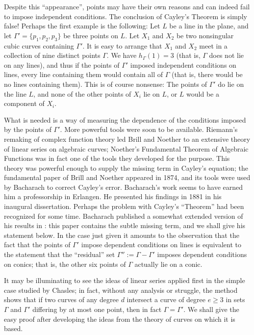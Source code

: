 \documentclass{bull-l}
\theoremstyle{pplain}
\theoremstyle{definition}
\begin{document}
Despite this ``appearance'', points may have their own reasons and can indeed
fail to impose independent conditions.  The conclusion of Cayley's Theorem is
simply false!  Perhaps the first example is the following: Let $L$ be a line in
the plane, and let $\Gamma'=\{p_1,p_2,p_3\}$ be three points on $L$.  Let $X_1$
and $X_2$ be two nonsingular cubic curves containing $\Gamma'$.  It is easy to
arrange that $X_1$ and $X_2$ meet in a collection of nine distinct points $
\Gamma$. We have $h_\Gamma(1)=3$ (that is, $\Gamma$ does not lie on any lines),
and thus if the points of $\Gamma'$ imposed independent conditions on lines,
every line containing them would contain all of $\Gamma$ (that is, there would
be no lines containing them).  This is of course nonsense: The points of $
\Gamma'$ do lie on the line $L$, and none of the other points of
$X_i$ lie on $L$, or $L$ would be a component of $X_i$.

What is needed is a way of measuring the dependence of the conditions imposed
by the points of $\Gamma'$. More powerful tools were soon to be available.  
Riemann's remaking of complex function theory led Brill and Noether to an
extensive theory of linear series on algebraic curves; Noether's Fundamental 
Theorem of Algebraic Functions was in fact one of the tools they developed for
 the purpose.  This theory was powerful enough to supply the missing term in 
Cayley's equation; the fundamental paper of Brill and Noether appeared in 1874,
and its tools were used by Bacharach to correct Cayley's error.  Bacharach's
work seems to have earned him a professorship in Erlangen.  He presented
his findings in 1881 in his inaugural dissertation.  Perhaps the problem with
Cayley's ``Theorem'' had been recognized for some time.  Bacharach published a
somewhat extended version of his results in \cite{Ba}: this paper contains the
subtle missing term, and we shall give his statement below.  In the case just
given it amounts to the observation that the fact that the points of $\Gamma'$
impose dependent conditions on lines is equivalent to the statement that the
``residual'' set $\Gamma'':=\Gamma-\Gamma'$ imposes dependent conditions on
conics; that is, the other six points of $\Gamma$ actually lie on a conic.

It may be illuminating to see the ideas of linear series applied first in the
simple case studied by Chasles; in fact, without any analysis or struggle, the
method shows that if two curves of any degree $d$ intersect a curve of degree
$e\ge 3$ in sets $\Gamma$ and $\Gamma'$ differing by at most one point, then
in fact $\Gamma=\Gamma'$.  We shall give the easy proof after developing the
ideas from the theory of curves on which it is based.
\end{document}
